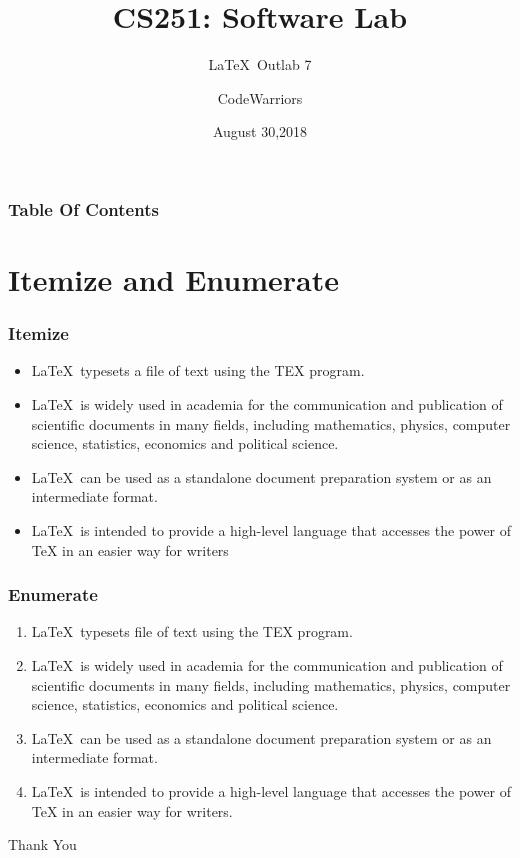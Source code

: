 \documentclass{beamer}
\title{CS251: Software Lab}
\subtitle{\LaTeX \ Outlab 7}
\author[CodeWarriors,170050018,170050088,170100091]{CodeWarriors \newline 170050018 \newline 170050088 \newline 170100091}
\institute{Indian Institute of Technology,Bombay }
\date{August 30,2018}
\begin{document}
\frame{\titlepage}
 
\begin{frame}
\frametitle{Table Of Contents}
\tableofcontents
\end{frame}
\section{Itemize and Enumerate}

\begin{frame}
\frametitle{Itemize}

\begin{itemize}
\item \LaTeX \ typesets a file of text using the TEX program.
\item \LaTeX \ is widely used in academia for the communication and publication of scientific documents in many fields, including
mathematics, physics, computer science, statistics, economics
and political science.
\item \LaTeX \ can be used as a standalone document preparation system or as an intermediate format.
\item \LaTeX \ is intended to provide a high-level language that accesses the power of TeX in an easier way for writers

\end{itemize}

\end{frame}

\begin{frame}

\frametitle{Enumerate}
\begin{enumerate}
\item \LaTeX \ typesets file of text using the TEX program.
\item \LaTeX \ is widely used in academia for the communication and publication of scientific documents in many fields, including mathematics, physics, computer science, statistics, economics and political science. 
\item \LaTeX \ can be used as a standalone document preparation system or as an intermediate format.
\item \LaTeX \ is intended to provide a high-level language that accesses the power of TeX in an easier way for writers.
\end{enumerate}


\end{frame}

\begin{frame}
\begin{center}
\huge Thank You
\end{center}
\end{frame}
\end{document}
